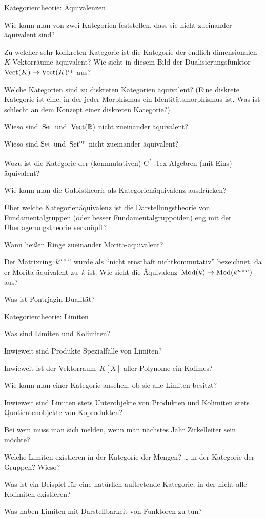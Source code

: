 \documentclass{uebblatt}
\begin{document}
\begin{aufgabeE}{Kategorientheorie: Äquivalenzen}
\item Wie kann man von zwei Kategorien feststellen, dass sie nicht zueinander
äquivalent sind?
\item Zu welcher sehr konkreten Kategorie ist die Kategorie der
endlich-dimensionalen~$K$-Vektorräume äquivalent? Wie sieht in diesem Bild der
Dualisierungsfunktor~$\mathrm{Vect}(K) \to \mathrm{Vect}(K)^{\mathrm{op}}$ aus?
\item Welche Kategorien sind zu diskreten Kategorien äquivalent? (Eine diskrete
Kategorie ist eine, in der jeder Morphismus ein Identitätsmorphismus ist. Was
ist schlecht an dem Konzept einer diskreten Kategorie?)
\item Wieso sind~$\mathrm{Set}$ und~$\mathrm{Vect}(\mathbb{R})$ nicht zueinander äquivalent?
\item Wieso sind $\mathrm{Set}$ und~$\mathrm{Set}^{\mathrm{op}}$ nicht zueinander äquivalent?
\item Wozu ist die Kategorie der (kommutativen)
C\textsuperscript{*}\kern-.1ex-Algebren (mit Eins) äquivalent?
\item Wie kann man die Galoistheorie als Kategorienäquivalenz ausdrücken?
\item Über welche Kategorienäquivalenz ist die Darstellungstheorie von
Fundamentalgruppen (oder besser Fundamentalgruppoiden) eng mit der
Überlagerungstheorie verknüpft?
\item Wann heißen Ringe zueinander Morita-äquivalent?
\item Der Matrixring~$k^{n \times n}$ wurde als "`nicht ernsthaft
nichtkommutativ"' bezeichnet, da er Morita-äquivalent zu~$k$ ist. Wie sieht die
Äquivalenz~$\mathrm{Mod}(k) \to \mathrm{Mod}(k^{n \times n})$ aus?
\item Was ist Pontrjagin-Dualität?
\end{aufgabeE}

\begin{aufgabeE}{Kategorientheorie: Limiten}
\item Was sind Limiten und Kolimiten?
\item Inwieweit sind Produkte Spezialfälle von Limiten?
\item Inwieweit ist der Vektorraum~$K[X]$ aller Polynome ein Kolimes?
\item Wie kann man einer Kategorie ansehen, ob sie alle Limiten besitzt?
\item Inwieweit sind Limiten stets Unterobjekte von Produkten und Kolimiten
stets Quotientenobjekte von Koprodukten?
\item Bei wem muss man sich melden, wenn man nächstes Jahr Zirkelleiter sein
möchte?
\item Welche Limiten existieren in der Kategorie der Mengen? \ldots{} in der
Kategorie der Gruppen? Wieso?
\item Was ist ein Beispiel für eine natürlich auftretende Kategorie, in der
nicht alle Kolimiten existieren?
\item Was haben Limiten mit Darstellbarkeit von Funktoren zu tun?
\end{aufgabeE}
\end{document}
